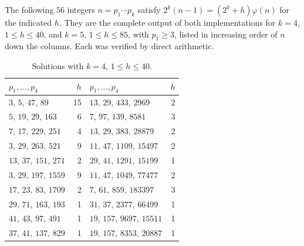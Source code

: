 \documentclass[11pt,reqno]{amsart}
\numberwithin{equation}{section}
\theoremstyle{plain}
\theoremstyle{definition}
\theoremstyle{remark}
\begin{document}
The following $56$ integers $n=p_1\cdots p_k$ satisfy
$2^k(n-1)=(2^k+h)\varphi(n)$ for the indicated $h$. They are the
complete output of both implementations for $k=4$, $1\le h\le40$, and
$k=5$, $1\le h\le85$, with $p_1\ge3$, listed in increasing order of
$n$ down the columns. Each was verified by direct arithmetic.

\begin{table}[ht]
\centering
\caption{Solutions with $k=4$, $1\le h\le40$.}
\label{tab:S4}
\smallskip
\footnotesize
\begin{tabular}{@{}lr@{\qquad}lr@{}}
\toprule
$p_1,\dots,p_4$ & $h$ & $p_1,\dots,p_4$ & $h$ \\
\midrule
$3,\,5,\,47,\,89$ & 15 & $13,\,29,\,433,\,2969$ & 2 \\
$5,\,19,\,29,\,163$ & 6 & $7,\,97,\,139,\,8581$ & 3 \\
$7,\,17,\,229,\,251$ & 4 & $13,\,29,\,383,\,28879$ & 2 \\
$3,\,29,\,263,\,521$ & 9 & $11,\,47,\,1109,\,15497$ & 2 \\
$13,\,37,\,151,\,271$ & 2 & $29,\,41,\,1291,\,15199$ & 1 \\
$3,\,29,\,197,\,1559$ & 9 & $11,\,47,\,1049,\,77477$ & 2 \\
$17,\,23,\,83,\,1709$ & 2 & $7,\,61,\,859,\,183397$ & 3 \\
$29,\,71,\,163,\,193$ & 1 & $31,\,37,\,2377,\,66499$ & 1 \\
$41,\,43,\,97,\,491$ & 1 & $19,\,157,\,9697,\,15511$ & 1 \\
$37,\,41,\,137,\,829$ & 1 & $19,\,157,\,8353,\,20887$ & 1 \\
\bottomrule
\end{tabular}
\end{table}
\end{document}

